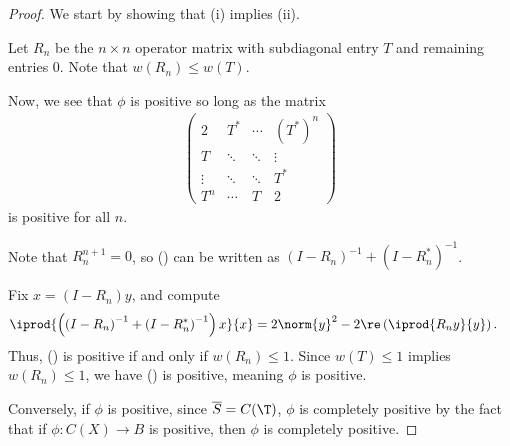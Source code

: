\documentclass[10pt]{mypackage}
\begin{document}
\begin{proof}
  We start by showing that (i) implies (ii).\newline

  Let $R_n$ be the $n\times n$ operator matrix with subdiagonal entry $T$ and remaining entries $0$. Note that $w\left( R_n \right)\leq w(T)$.\newline

  Now, we see that $\phi$ is positive so long as the matrix
  \begin{align*}
    \begin{pmatrix}2 & T^{\ast} & \cdots & \left( T^{\ast} \right)^n\\ T & \ddots & \ddots & \vdots \\ \vdots & \ddots & \ddots & T^{\ast} \\ T^n & \cdots & T & 2\end{pmatrix}\tag{\textasteriskcentered}
  \end{align*}
  is positive for all $n$.\newline

  Note that $R_n^{n+1} = 0$, so (\textasteriskcentered) can be written as $\left( I - R_n \right)^{-1} + \left( I - R_n^{\ast} \right)^{-1}$.\newline

  Fix $x = \left( I - R_n \right)y$, and compute
  \begin{align*}
    \iprod{\left( \left( I-R_n \right)^{-1} + \left( I - R_n^{\ast} \right)^{-1} \right)x}{x} &= 2\norm{y}^2 - 2\re \left( \iprod{R_n y}{y} \right).
  \end{align*}
  Thus, (\textasteriskcentered) is positive if and only if $w\left( R_n \right) \leq 1$. Since $w(T)\leq 1$ implies $w\left( R_n \right)\leq 1$, we have (\textasteriskcentered) is positive, meaning $\phi$ is positive.\newline

  Conversely, if $\phi$ is positive, since $\overline{S} = C(\T)$, $\phi$ is completely positive by the fact that if $\phi\colon C(X)\rightarrow B$ is positive, then $\phi$ is completely positive.\newline


\end{proof}
\end{document}
